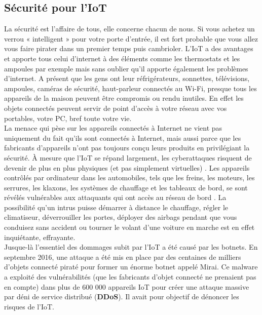 	\subsection{Sécurité pour l’IoT}
La sécurité est l’af{\kern0pt}faire de tous, elle concerne chacun de nous. Si vous achetez un verrou « intelligent » pour votre porte d’entrée, il est fort probable que vous allez vous faire pirater dans un premier temps puis cambrioler. L’IoT a des avantages et apporte tous celui d’internet à des éléments comme les thermostats et les ampoules par exemple mais sans oublier qu’il apporte également les problèmes d’internet. A présent que les gens ont leur réfrigérateurs, sonnettes, télévisions, ampoules, caméras de sécurité, haut-parleur connectés au Wi-Fi, presque tous les appareils de la maison peuvent être compromis ou rendu inutiles. En ef{\kern0pt}fet les objets connectés peuvent servir de point d’accès à votre réseau avec vos portables, votre PC, bref toute votre vie.\\

La menace qui pèse sur les appareils connectés à Internet ne vient pas uniquement du fait qu’ils sont connectés à Internet, mais aussi parce que les fabricants d’appareils n’ont pas toujours conçu leurs produits en privilégiant la sécurité. À mesure que l'IoT se répand largement, les cyberattaques risquent de devenir de plus en plus physiques (et pas simplement virtuelles) \cite{clearfield2013rethinkingsiot}. Les appareils contrôlés par ordinateur dans les automobiles, tels que les freins, les moteurs, les serrures, les klaxons, les systèmes de chauf{\kern0pt}fage et les tableaux de bord, se sont révélés vulnérables aux attaquants qui ont accès au réseau de bord \cite{andy2013hackers,boyle2010proof}. La possibilité qu'un intrus puisse démarrer à distance le chauf{\kern0pt}fage, régler le climatiseur, déverrouiller les portes, déployer des airbags pendant que vous conduisez sans accident ou tourner le volant d'une voiture en marche est en ef{\kern0pt}fet inquiétante, ef{\kern0pt}frayante.\\

Jusque-là l’essentiel des dommages subit par l’IoT a été causé par les botnets. En septembre 2016, une attaque a été mis en place par des centaines de milliers d’objets connecté piraté pour former un énorme botnet appelé Mirai. Ce malware a exploité des vulnérabilités (que les fabricants d’objet connecté ne prenaient pas en compte) dans plus de 600 000 appareils IoT pour créer une attaque massive par déni de service distribué (\textbf{DDoS}). Il avait pour objectif de dénoncer les risques de l’IoT.\\

